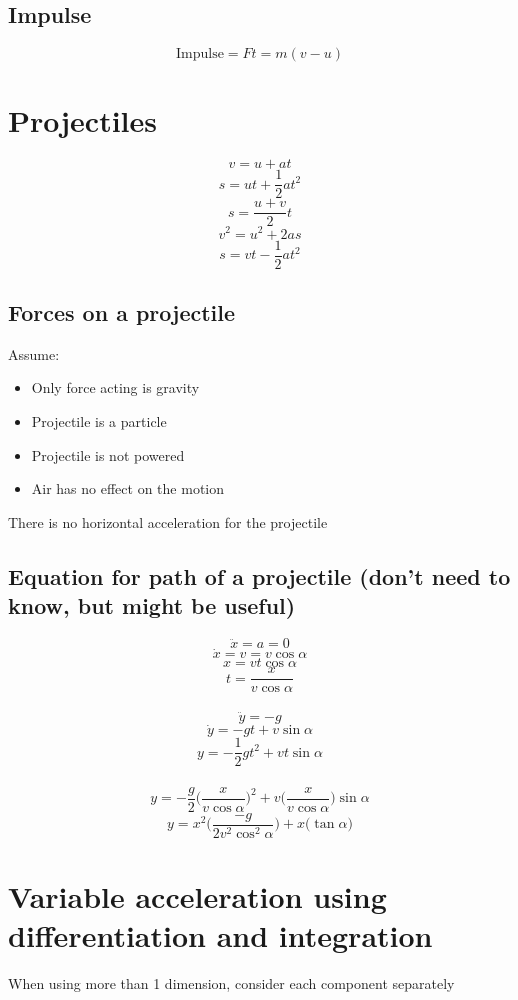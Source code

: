 \documentclass{article}[18pt]
\begin{document}
\subsection{Impulse}
$$\textrm{Impulse}=Ft=m(v-u)$$
\section{Projectiles}
$$v=u+at$$
$$s=ut+\frac{1}{2}at^2$$
$$s=\frac{u+v}{2}t$$
$$v^2=u^2+2as$$
$$s=vt-\frac{1}{2}at^2$$
\subsection{Forces on a projectile}
Assume:
\begin{itemize}
\item Only force acting is gravity
\item Projectile is a particle
\item Projectile is not powered
\item Air has no effect on the motion
\end{itemize}
There is no horizontal acceleration for the projectile
\subsection{Equation for path of a projectile (don't need to know, but might be useful)}
$$\ddot{x}=a=0$$
$$\dot{x}=v=v\cos\alpha$$
$$x=vt\cos\alpha$$
$$t=\frac{x}{v\cos\alpha}$$
\\
$$\ddot{y}=-g$$
$$\dot{y}=-gt+v\sin\alpha$$
$$y=-\frac{1}{2}gt^2+vt\sin\alpha$$
\\
$$y=-\frac{g}{2}\Bigg(\frac{x}{v\cos\alpha}\Bigg)^2+v\Bigg(\frac{x}{v\cos\alpha}\Bigg)\sin\alpha$$
$$y=x^2\Bigg(\frac{-g}{2v^2\cos^2\alpha}\Bigg)+x\Big(\tan\alpha\Big)$$
\section{Variable acceleration using differentiation and integration}
When using more than 1 dimension, consider each component separately \\
\begin{center}
\end{center}
\end{document}
